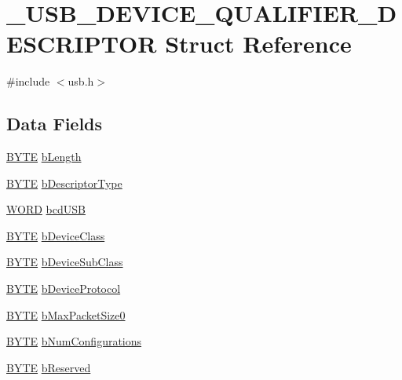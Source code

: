 \hypertarget{struct___u_s_b___d_e_v_i_c_e___q_u_a_l_i_f_i_e_r___d_e_s_c_r_i_p_t_o_r}{
\section{\_\-USB\_\-DEVICE\_\-QUALIFIER\_\-DESCRIPTOR Struct Reference}
\label{struct___u_s_b___d_e_v_i_c_e___q_u_a_l_i_f_i_e_r___d_e_s_c_r_i_p_t_o_r}
}


{\ttfamily \#include $<$usb.h$>$}

\subsection*{Data Fields}
\begin{DoxyCompactItemize}
\item 
\hyperlink{type_8h_a4ae1dab0fb4b072a66584546209e7d58}{BYTE} \hyperlink{struct___u_s_b___d_e_v_i_c_e___q_u_a_l_i_f_i_e_r___d_e_s_c_r_i_p_t_o_r_a8e443464272fdf3bd5148df0b7f5dcaf}{bLength}
\item 
\hyperlink{type_8h_a4ae1dab0fb4b072a66584546209e7d58}{BYTE} \hyperlink{struct___u_s_b___d_e_v_i_c_e___q_u_a_l_i_f_i_e_r___d_e_s_c_r_i_p_t_o_r_ac1d02ce6fe165032044fb81602a9b07c}{bDescriptorType}
\item 
\hyperlink{type_8h_a197942eefa7db30960ae396d68339b97}{WORD} \hyperlink{struct___u_s_b___d_e_v_i_c_e___q_u_a_l_i_f_i_e_r___d_e_s_c_r_i_p_t_o_r_a813490518a88d421eb8eceaf467eab9b}{bcdUSB}
\item 
\hyperlink{type_8h_a4ae1dab0fb4b072a66584546209e7d58}{BYTE} \hyperlink{struct___u_s_b___d_e_v_i_c_e___q_u_a_l_i_f_i_e_r___d_e_s_c_r_i_p_t_o_r_ab1f7e35fe9a285db2864e8244884c4d9}{bDeviceClass}
\item 
\hyperlink{type_8h_a4ae1dab0fb4b072a66584546209e7d58}{BYTE} \hyperlink{struct___u_s_b___d_e_v_i_c_e___q_u_a_l_i_f_i_e_r___d_e_s_c_r_i_p_t_o_r_a1bfedb2dbf987caf616f77707f4e7996}{bDeviceSubClass}
\item 
\hyperlink{type_8h_a4ae1dab0fb4b072a66584546209e7d58}{BYTE} \hyperlink{struct___u_s_b___d_e_v_i_c_e___q_u_a_l_i_f_i_e_r___d_e_s_c_r_i_p_t_o_r_ad38c30dbe1ba3c63a2a24c3e2f988157}{bDeviceProtocol}
\item 
\hyperlink{type_8h_a4ae1dab0fb4b072a66584546209e7d58}{BYTE} \hyperlink{struct___u_s_b___d_e_v_i_c_e___q_u_a_l_i_f_i_e_r___d_e_s_c_r_i_p_t_o_r_aad07704534145b010921a7ca41a30edf}{bMaxPacketSize0}
\item 
\hyperlink{type_8h_a4ae1dab0fb4b072a66584546209e7d58}{BYTE} \hyperlink{struct___u_s_b___d_e_v_i_c_e___q_u_a_l_i_f_i_e_r___d_e_s_c_r_i_p_t_o_r_a6170c2c859a226f8dae80b59903e7ca2}{bNumConfigurations}
\item 
\hyperlink{type_8h_a4ae1dab0fb4b072a66584546209e7d58}{BYTE} \hyperlink{struct___u_s_b___d_e_v_i_c_e___q_u_a_l_i_f_i_e_r___d_e_s_c_r_i_p_t_o_r_aaf8f2b73c01880ceea844ddeae5e098e}{bReserved}
\end{DoxyCompactItemize}


